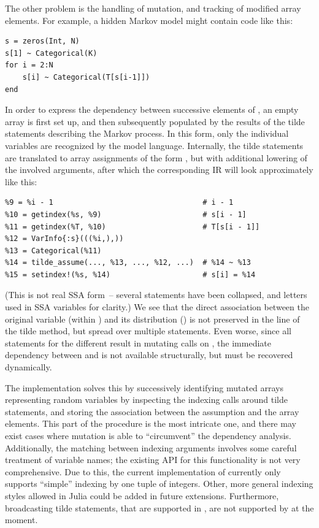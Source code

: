 The other problem is the handling of mutation, and tracking of modified array elements.  For
example, a hidden Markov model might contain code like this:
\begin{lstlisting}
s = zeros(Int, N)
s[1] ~ Categorical(K)
for i = 2:N
    s[i] ~ Categorical(T[s[i-1]])
end
\end{lstlisting}
In order to express the dependency between successive elements of , an empty array is first
set up, and then subsequently populated by the results of the tilde statements describing the Markov
process.  In this form, only the individual variables  are recognized by the model
language.  Internally, the tilde statements are translated to array assignments of the form
, but with additional lowering of the involved arguments, after
which the corresponding IR will look approximately like this:
\begin{lstlisting}
%9 = %i - 1                                  # i - 1
%10 = getindex(%s, %9)                       # s[i - 1]
%11 = getindex(%T, %10)                      # T[s[i - 1]]
%12 = VarInfo{:s}(((%i,),))
%13 = Categorical(%11)
%14 = tilde_assume(..., %13, ..., %12, ...)  # %14 ~ %13
%15 = setindex!(%s, %14)                     # s[i] = %14
\end{lstlisting}
(This is not real SSA form~-- several statements have been collapsed, and letters used in SSA
variables for clarity.)  We see that the direct association between the original variable
 (within ) and its distribution () is not preserved in the line
of the tilde method, but spread over multiple statements.  Even worse, since all statements for the
different  result in mutating  calls on , the immediate
dependency between  and  is not available structurally, but must be
recovered dynamically.

The  implementation solves this by successively identifying mutated arrays
representing random variables by inspecting the indexing calls around tilde statements, and storing
the association between the assumption and the array elements.  This part of the procedure is the
most intricate one, and there may exist cases where mutation is able to \enquote{circumvent} the
dependency analysis.  Additionally, the matching between indexing arguments involves some careful
treatment of variable names; the existing \dppljl{} API for this functionality is not very
comprehensive.  Due to this, the current implementation of \autogibbsjl{} currently only supports
\enquote{simple} indexing by one tuple of integers.  Other, more general indexing styles allowed in
Julia could be added in future extensions.  Furthermore, broadcasting tilde statements, that are
supported in \dppljl{}, are not supported by \autogibbsjl{} at the moment.


